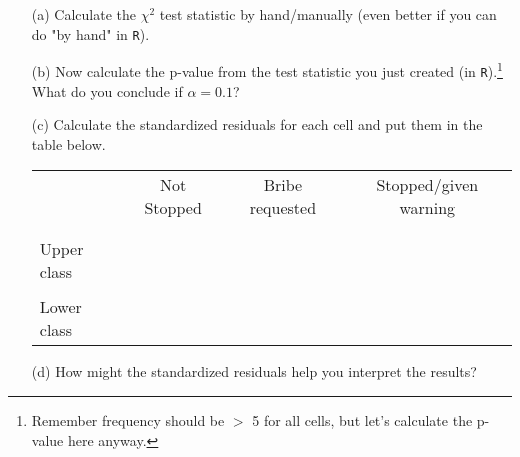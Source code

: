 \documentclass[12pt,letterpaper]{article}
\begin{document}
\begin{enumerate}
	
	\item [(a)]
	Calculate the $\chi^2$ test statistic by hand/manually (even better if you can do "by hand" in \texttt{R}).\\
	\vspace{7cm}
	
	\item [(b)]
	Now calculate the p-value from the test statistic you just created (in \texttt{R}).\footnote{Remember frequency should be $>$ 5 for all cells, but let's calculate the p-value here anyway.}  What do you conclude if $\alpha = 0.1$?\\
	
	\newpage
	\item [(c)] Calculate the standardized residuals for each cell and put them in the table below.
	\vspace{1cm}
	
	\begin{table}[h]
		\centering
		\begin{tabular}{l | c c c }
			& Not Stopped & Bribe requested & Stopped/given warning \\
			\\[-1.8ex] 
			\hline \\[-1.8ex]
			Upper class  &  &  &  \\
			\\
			Lower class &  &   &   \\
			
		\end{tabular}
	\end{table}
	
	
	\vspace{7cm}
	\item [(d)] How might the standardized residuals help you interpret the results?  
	
\end{enumerate}
\newpage
\end{document}
